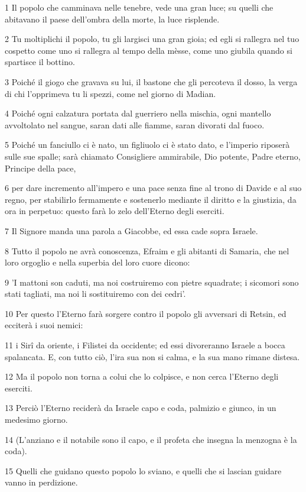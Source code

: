 \par 1 Il popolo che camminava nelle tenebre, vede una gran luce; su quelli che abitavano il paese dell'ombra della morte, la luce risplende.
\par 2 Tu moltiplichi il popolo, tu gli largisci una gran gioia; ed egli si rallegra nel tuo cospetto come uno si rallegra al tempo della mèsse, come uno giubila quando si spartisce il bottino.
\par 3 Poiché il giogo che gravava su lui, il bastone che gli percoteva il dosso, la verga di chi l'opprimeva tu li spezzi, come nel giorno di Madian.
\par 4 Poiché ogni calzatura portata dal guerriero nella mischia, ogni mantello avvoltolato nel sangue, saran dati alle fiamme, saran divorati dal fuoco.
\par 5 Poiché un fanciullo ci è nato, un figliuolo ci è stato dato, e l'imperio riposerà sulle sue spalle; sarà chiamato Consigliere ammirabile, Dio potente, Padre eterno, Principe della pace,
\par 6 per dare incremento all'impero e una pace senza fine al trono di Davide e al suo regno, per stabilirlo fermamente e sostenerlo mediante il diritto e la giustizia, da ora in perpetuo: questo farà lo zelo dell'Eterno degli eserciti.
\par 7 Il Signore manda una parola a Giacobbe, ed essa cade sopra Israele.
\par 8 Tutto il popolo ne avrà conoscenza, Efraim e gli abitanti di Samaria, che nel loro orgoglio e nella superbia del loro cuore dicono:
\par 9 'I mattoni son caduti, ma noi costruiremo con pietre squadrate; i sicomori sono stati tagliati, ma noi li sostituiremo con dei cedri'.
\par 10 Per questo l'Eterno farà sorgere contro il popolo gli avversari di Retsin, ed ecciterà i suoi nemici:
\par 11 i Sirî da oriente, i Filistei da occidente; ed essi divoreranno Israele a bocca spalancata. E, con tutto ciò, l'ira sua non si calma, e la sua mano rimane distesa.
\par 12 Ma il popolo non torna a colui che lo colpisce, e non cerca l'Eterno degli eserciti.
\par 13 Perciò l'Eterno reciderà da Israele capo e coda, palmizio e giunco, in un medesimo giorno.
\par 14 (L'anziano e il notabile sono il capo, e il profeta che insegna la menzogna è la coda).
\par 15 Quelli che guidano questo popolo lo sviano, e quelli che si lascian guidare vanno in perdizione.
